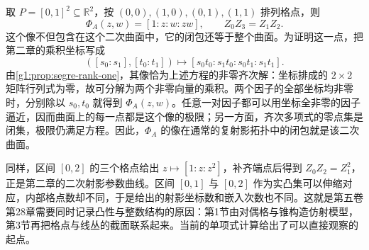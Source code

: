 \begin{example}\label{g1:exm:lattice-square-segre}
	取 \(P=[0,1]^2\subseteq\mathbb R^2\)，按 \((0,0),(1,0),(0,1),(1,1)\) 排列格点，则
	\[
		\Phi_A(z,w)=[1:z:w:zw],\qquad Z_0Z_3=Z_1Z_2.
	\]
	这个像不但包含在这个二次曲面中，它的闭包还等于整个曲面。为证明这一点，把第二章的乘积坐标写成
	\[
		([s_0:s_1],[t_0:t_1])\longmapsto
		[s_0t_0:s_1t_0:s_0t_1:s_1t_1].
	\]
	由\cref{g1:prop:segre-rank-one}，其像恰为上述方程的非零齐次解：坐标排成的 \(2\times2\) 矩阵行列式为零，故可分解为两个非零向量的乘积。两个因子的全部坐标均非零时，分别除以 \(s_0,t_0\) 就得到 \(\Phi_A(z,w)\)。任意一对因子都可以用坐标全非零的因子逼近，因而曲面上的每一点都是这个像的极限；另一方面，齐次多项式的零点集是闭集，极限仍满足方程。因此，\(\Phi_A\) 的像在通常的复射影拓扑中的闭包就是该二次曲面。
\end{example}

同样，区间 \([0,2]\) 的三个格点给出 \(z\mapsto[1:z:z^2]\)，补齐端点后得到 \(Z_0Z_2=Z_1^2\)，正是第二章的二次射影参数曲线。区间 \([0,1]\) 与 \([0,2]\) 作为实凸集可以伸缩对应，内部格点数却不同，于是给出的射影坐标数和嵌入次数也不同。这就是第五卷第28章需要同时记录凸性与整数结构的原因：第1节由对偶格与锥构造仿射模型，第3节再把格点与线丛的截面联系起来。当前的单项式计算给出了可以直接观察的起点。

